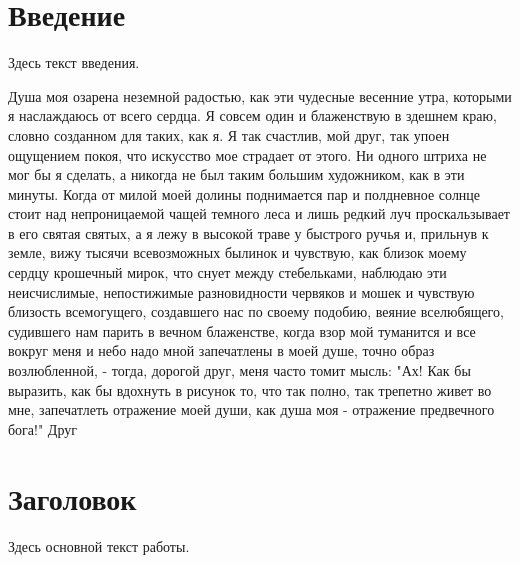 
\newcommand{\No}{\textnumero}







\maketitle

\tableofcontents

\section*{Введение}
Здесь текст введения.

Душа моя озарена неземной радостью, как эти чудесные весенние утра, которыми я наслаждаюсь от всего сердца. Я совсем один и блаженствую в здешнем краю, словно созданном для таких, как я. Я так счастлив, мой друг, так упоен ощущением покоя, что искусство мое страдает от этого. Ни одного штриха не мог бы я сделать, а никогда не был таким большим художником, как в эти минуты. Когда от милой моей долины поднимается пар и полдневное солнце стоит над непроницаемой чащей темного леса и лишь редкий луч проскальзывает в его святая святых, а я лежу в высокой траве у быстрого ручья и, прильнув к земле, вижу тысячи всевозможных былинок и чувствую, как близок моему сердцу крошечный мирок, что снует между стебельками, наблюдаю эти неисчислимые, непостижимые разновидности червяков и мошек и чувствую близость всемогущего, создавшего нас по своему подобию, веяние вселюбящего, судившего нам парить в вечном блаженстве, когда взор мой туманится и все вокруг меня и небо надо мной запечатлены в моей душе, точно образ возлюбленной, - тогда, дорогой друг, меня часто томит мысль: "Ах! Как бы выразить, как бы вдохнуть в рисунок то, что так полно, так трепетно живет во мне, запечатлеть отражение моей души, как душа моя - отражение предвечного бога!" Друг



\section{Заголовок}
Здесь основной текст работы\cite{BookRef, ArticleRef, LinkRef}.

